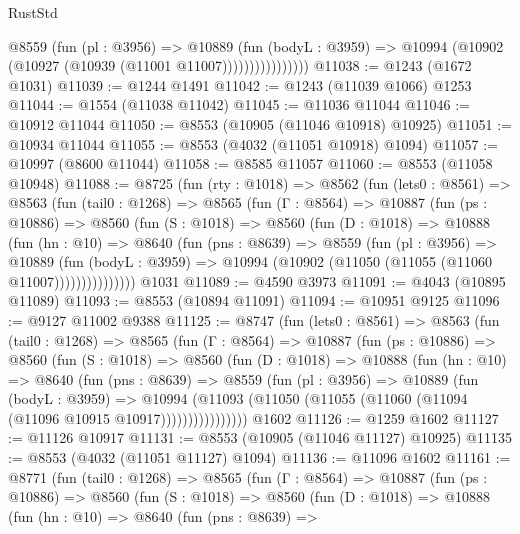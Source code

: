 \begin{lexlean}{RustStd}
\begin{coremodule}
                      @8559
                        (fun (pl : @3956) =>
                        @10889
                          (fun (bodyL : @3959) =>
                          @10994 (@10902 (@10927 (@10939 (@11001 @11007))))))))))))))))
@11038 := @1243 (@1672 @1031)
@11039 := @1244 @1491
@11042 := @1243 (@11039 @1066) @1253
@11044 := @1554 (@11038 @11042)
@11045 := @11036 @11044
@11046 := @10912 @11044
@11050 := @8553 (@10905 (@11046 @10918) @10925)
@11051 := @10934 @11044
@11055 := @8553 (@4032 (@11051 @10918) @1094)
@11057 := @10997 (@8600 @11044)
@11058 := @8585 @11057
@11060 := @8553 (@11058 @10948)
@11088 := @8725
    (fun (rty : @1018) =>
    @8562
      (fun (lets0 : @8561) =>
      @8563
        (fun (tail0 : @1268) =>
        @8565
          (fun (Γ : @8564) =>
          @10887
            (fun (ps : @10886) =>
            @8560
              (fun (S : @1018) =>
              @8560
                (fun (D : @1018) =>
                @10888
                  (fun (hn : @10) =>
                  @8640
                    (fun (pns : @8639) =>
                    @8559
                      (fun (pl : @3956) =>
                      @10889
                        (fun (bodyL : @3959) =>
                        @10994 (@10902 (@11050 (@11055 (@11060 @11007)))))))))))))))
    @1031
@11089 := @4590 @3973
@11091 := @4043 (@10895 @11089)
@11093 := @8553 (@10894 @11091)
@11094 := @10951 @9125
@11096 := @9127 @11002 @9388
@11125 := @8747
    (fun (lets0 : @8561) =>
    @8563
      (fun (tail0 : @1268) =>
      @8565
        (fun (Γ : @8564) =>
        @10887
          (fun (ps : @10886) =>
          @8560
            (fun (S : @1018) =>
            @8560
              (fun (D : @1018) =>
              @10888
                (fun (hn : @10) =>
                @8640
                  (fun (pns : @8639) =>
                  @8559
                    (fun (pl : @3956) =>
                    @10889
                      (fun (bodyL : @3959) =>
                      @10994
                        (@11093
                          (@11050 (@11055 (@11060 (@11094 (@11096 @10915 @10917))))))))))))))))
    @1602
@11126 := @1259 @1602
@11127 := @11126 @10917
@11131 := @8553 (@10905 (@11046 @11127) @10925)
@11135 := @8553 (@4032 (@11051 @11127) @1094)
@11136 := @11096 @1602
@11161 := @8771
    (fun (tail0 : @1268) =>
    @8565
      (fun (Γ : @8564) =>
      @10887
        (fun (ps : @10886) =>
        @8560
          (fun (S : @1018) =>
          @8560
            (fun (D : @1018) =>
            @10888
              (fun (hn : @10) =>
              @8640
                (fun (pns : @8639) =>

\end{coremodule}
\end{lexlean}

